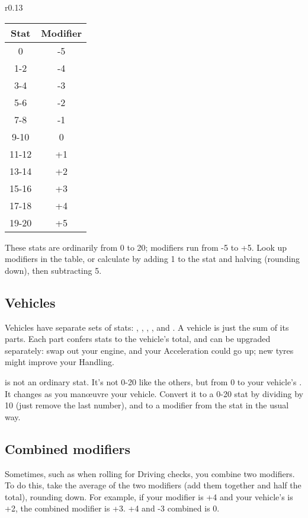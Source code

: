 \documentclass[10pt, a4paper, twocolumn]{article}
\begin{document}
\begin{wraptable}[12]{r}{0.13\textwidth}
\vspace*{-3ex}
\hspace*{-3ex}
\begin{tabular}{cc}
  Stat  & Modifier \\
  \hline 
  0     & -5       \\
  1-2   & -4       \\
  3-4   & -3       \\
  5-6   & -2       \\
  7-8   & -1       \\
  9-10  &  0       \\
  11-12 & +1       \\
  13-14 & +2       \\
  15-16 & +3       \\
  17-18 & +4       \\
  19-20 & +5
\end{tabular}
\end{wraptable}

These stats are ordinarily from 0 to 20; modifiers run from -5 to +5. Look up
modifiers in the table, or calculate by adding 1 to the stat and halving
(rounding down), then subtracting 5.

\subsection{Vehicles}
Vehicles have separate sets of stats: , ,
, ,  and . A vehicle
is just the sum of its parts. Each part confers stats to the vehicle's total,
and can be upgraded separately: swap out your engine, and your Acceleration
could go up; new tyres might improve your Handling. 

 is not an ordinary stat. It's not 0-20 like the others, but from 0
to your vehicle's . It changes as you man\oe{}uvre your
vehicle. Convert it to a 0-20 stat by dividing by 10 (just remove the last
number), and to a modifier from the stat in the usual way.

\subsection{Combined modifiers}
Sometimes, such as when rolling for Driving checks, you combine two
modifiers. To do this, take the average of the two modifiers (add them
together and half the total), rounding down. For example, if your 
modifier is +4 and your vehicle's  is +2, the combined modifier
is +3. +4 and -3 combined is 0.
\end{document}
